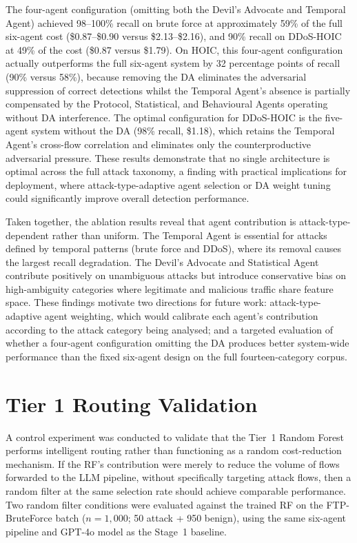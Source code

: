 The four-agent configuration (omitting both the Devil's Advocate and Temporal Agent) achieved 98--100\% recall on brute force at approximately 59\% of the full six-agent cost (\$0.87--\$0.90 versus \$2.13--\$2.16), and 90\% recall on DDoS-HOIC at 49\% of the cost (\$0.87 versus \$1.79). On HOIC, this four-agent configuration actually outperforms the full six-agent system by 32 percentage points of recall (90\% versus 58\%), because removing the DA eliminates the adversarial suppression of correct detections whilst the Temporal Agent's absence is partially compensated by the Protocol, Statistical, and Behavioural Agents operating without DA interference. The optimal configuration for DDoS-HOIC is the five-agent system without the DA (98\% recall, \$1.18), which retains the Temporal Agent's cross-flow correlation and eliminates only the counterproductive adversarial pressure. These results demonstrate that no single architecture is optimal across the full attack taxonomy, a finding with practical implications for deployment, where attack-type-adaptive agent selection or DA weight tuning could significantly improve overall detection performance.

Taken together, the ablation results reveal that agent contribution is attack-type-dependent rather than uniform. The Temporal Agent is essential for attacks defined by temporal patterns (brute force and DDoS), where its removal causes the largest recall degradation. The Devil's Advocate and Statistical Agent contribute positively on unambiguous attacks but introduce conservative bias on high-ambiguity categories where legitimate and malicious traffic share feature space. These findings motivate two directions for future work: attack-type-adaptive agent weighting, which would calibrate each agent's contribution according to the attack category being analysed; and a targeted evaluation of whether a four-agent configuration omitting the DA produces better system-wide performance than the fixed six-agent design on the full fourteen-category corpus.

\section{Tier 1 Routing Validation}
\label{sec:routing-validation}

A control experiment was conducted to validate that the Tier~1 Random Forest performs intelligent routing rather than functioning as a random cost-reduction mechanism. If the RF's contribution were merely to reduce the volume of flows forwarded to the LLM pipeline, without specifically targeting attack flows, then a random filter at the same selection rate should achieve comparable performance. Two random filter conditions were evaluated against the trained RF on the FTP-BruteForce batch ($n = 1{,}000$; 50 attack + 950 benign), using the same six-agent pipeline and GPT-4o model as the Stage~1 baseline.

